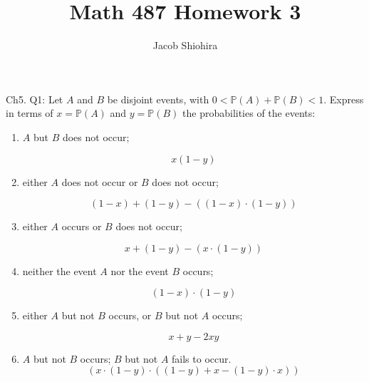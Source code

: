 \documentclass[12pt]{article}
\begin{document}
\title{Math 487 Homework 3}
\author{Jacob Shiohira}
\maketitle

\noindent
Ch5. Q1: Let $A$ and $B$ be disjoint events, with $0 < \mathbb{P}(A) + \mathbb{P}(B) < 1$. Express in terms of $x = \mathbb{P}(A)$ and $y=\mathbb{P}(B)$ the probabilities of the events:

\begin{center}
\begin{enumerate}[label=(\alph*)]
\item $A$ but $B$ does not occur;

\begin{equation*}
x(1-y)
\end{equation*}

\item either $A$ does not occur or $B$ does not occur;

\begin{equation*}
(1-x)+(1-y)-((1-x) \cdot (1-y))
\end{equation*}

\item either $A$ occurs or $B$ does not occur; 

\begin{equation*}
x + (1-y) - (x \cdot (1-y))
\end{equation*}

\item neither the event $A$ nor the event $B$ occurs;

\begin{equation*}
(1-x) \cdot (1-y)
\end{equation*}

\item either $A$ but not $B$ occurs, or $B$ but not $A$ occurs;

\begin{equation*}
x+y-2xy
\end{equation*}

\item $A$ but not $B$ occurs; $B$ but not $A$ fails to occur.
\begin{equation*}
(x \cdot (1-y) \cdot ((1-y) + x - (1-y) \cdot x))
\end{equation*}

\end{enumerate}
\end{center}
\end{document}
